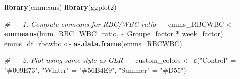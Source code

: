 \documentclass[
]{article}
\newenvironment{Shaded}{\begin{snugshade}}{\end{snugshade}}
\newcommand{\CommentTok}[1]{\textcolor[rgb]{0.56,0.35,0.01}{\textit{#1}}}
\newcommand{\FunctionTok}[1]{\textcolor[rgb]{0.13,0.29,0.53}{\textbf{#1}}}
\newcommand{\NormalTok}[1]{#1}
\newcommand{\OtherTok}[1]{\textcolor[rgb]{0.56,0.35,0.01}{#1}}
\newcommand{\SpecialCharTok}[1]{\textcolor[rgb]{0.81,0.36,0.00}{\textbf{#1}}}
\newcommand{\StringTok}[1]{\textcolor[rgb]{0.31,0.60,0.02}{#1}}
\begin{document}
\begin{Shaded}
\begin{Highlighting}[]
\FunctionTok{library}\NormalTok{(emmeans)}
\FunctionTok{library}\NormalTok{(ggplot2)}

\CommentTok{\# {-}{-}{-} 1. Compute emmeans for RBC/WBC ratio {-}{-}{-}}
\NormalTok{emms\_RBCWBC }\OtherTok{\textless{}{-}} \FunctionTok{emmeans}\NormalTok{(lmm\_RBC\_WBC\_ratio, }\SpecialCharTok{\textasciitilde{}}\NormalTok{ Groupe\_factor }\SpecialCharTok{*}\NormalTok{ week\_factor)}
\NormalTok{emms\_df\_rbcwbc }\OtherTok{\textless{}{-}} \FunctionTok{as.data.frame}\NormalTok{(emms\_RBCWBC)}

\CommentTok{\# {-}{-}{-} 2. Plot using same style as GLR {-}{-}{-}}
\NormalTok{custom\_colors }\OtherTok{\textless{}{-}} \FunctionTok{c}\NormalTok{(}\StringTok{"Control"} \OtherTok{=} \StringTok{"\#009E73"}\NormalTok{, }\StringTok{"Winter"} \OtherTok{=} \StringTok{"\#56B4E9"}\NormalTok{, }\StringTok{"Summer"} \OtherTok{=} \StringTok{"\#D55"}\NormalTok{)}


\end{Highlighting}
\end{Shaded}
\end{document}
